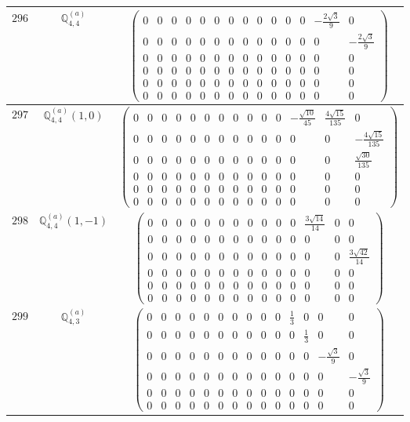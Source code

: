 \documentclass[fleqn,8pt,landscape]{jsarticle}
\begin{document}
\begin{center}
\begin{longtable}{ccc}
$ 296 $ & $ \mathbb{Q}_{4,4}^{(a)} $ & $ \begin{pmatrix} 0 & 0 & 0 & 0 & 0 & 0 & 0 & 0 & 0 & 0 & 0 & 0 & - \frac{2 \sqrt{3}}{9} & 0 \\ 0 & 0 & 0 & 0 & 0 & 0 & 0 & 0 & 0 & 0 & 0 & 0 & 0 & - \frac{2 \sqrt{3}}{9} \\ 0 & 0 & 0 & 0 & 0 & 0 & 0 & 0 & 0 & 0 & 0 & 0 & 0 & 0 \\ 0 & 0 & 0 & 0 & 0 & 0 & 0 & 0 & 0 & 0 & 0 & 0 & 0 & 0 \\ 0 & 0 & 0 & 0 & 0 & 0 & 0 & 0 & 0 & 0 & 0 & 0 & 0 & 0 \\ 0 & 0 & 0 & 0 & 0 & 0 & 0 & 0 & 0 & 0 & 0 & 0 & 0 & 0 \end{pmatrix} $ \\ \hline
$ 297 $ & $ \mathbb{Q}_{4,4}^{(a)}(1,0) $ & $ \begin{pmatrix} 0 & 0 & 0 & 0 & 0 & 0 & 0 & 0 & 0 & 0 & 0 & - \frac{\sqrt{10}}{45} & \frac{4 \sqrt{15}}{135} & 0 \\ 0 & 0 & 0 & 0 & 0 & 0 & 0 & 0 & 0 & 0 & 0 & 0 & 0 & - \frac{4 \sqrt{15}}{135} \\ 0 & 0 & 0 & 0 & 0 & 0 & 0 & 0 & 0 & 0 & 0 & 0 & 0 & \frac{\sqrt{30}}{135} \\ 0 & 0 & 0 & 0 & 0 & 0 & 0 & 0 & 0 & 0 & 0 & 0 & 0 & 0 \\ 0 & 0 & 0 & 0 & 0 & 0 & 0 & 0 & 0 & 0 & 0 & 0 & 0 & 0 \\ 0 & 0 & 0 & 0 & 0 & 0 & 0 & 0 & 0 & 0 & 0 & 0 & 0 & 0 \end{pmatrix} $ \\ \hline
$ 298 $ & $ \mathbb{Q}_{4,4}^{(a)}(1,-1) $ & $ \begin{pmatrix} 0 & 0 & 0 & 0 & 0 & 0 & 0 & 0 & 0 & 0 & 0 & \frac{3 \sqrt{14}}{14} & 0 & 0 \\ 0 & 0 & 0 & 0 & 0 & 0 & 0 & 0 & 0 & 0 & 0 & 0 & 0 & 0 \\ 0 & 0 & 0 & 0 & 0 & 0 & 0 & 0 & 0 & 0 & 0 & 0 & 0 & \frac{3 \sqrt{42}}{14} \\ 0 & 0 & 0 & 0 & 0 & 0 & 0 & 0 & 0 & 0 & 0 & 0 & 0 & 0 \\ 0 & 0 & 0 & 0 & 0 & 0 & 0 & 0 & 0 & 0 & 0 & 0 & 0 & 0 \\ 0 & 0 & 0 & 0 & 0 & 0 & 0 & 0 & 0 & 0 & 0 & 0 & 0 & 0 \end{pmatrix} $ \\ \hline
$ 299 $ & $ \mathbb{Q}_{4,3}^{(a)} $ & $ \begin{pmatrix} 0 & 0 & 0 & 0 & 0 & 0 & 0 & 0 & 0 & 0 & \frac{1}{3} & 0 & 0 & 0 \\ 0 & 0 & 0 & 0 & 0 & 0 & 0 & 0 & 0 & 0 & 0 & \frac{1}{3} & 0 & 0 \\ 0 & 0 & 0 & 0 & 0 & 0 & 0 & 0 & 0 & 0 & 0 & 0 & - \frac{\sqrt{3}}{9} & 0 \\ 0 & 0 & 0 & 0 & 0 & 0 & 0 & 0 & 0 & 0 & 0 & 0 & 0 & - \frac{\sqrt{3}}{9} \\ 0 & 0 & 0 & 0 & 0 & 0 & 0 & 0 & 0 & 0 & 0 & 0 & 0 & 0 \\ 0 & 0 & 0 & 0 & 0 & 0 & 0 & 0 & 0 & 0 & 0 & 0 & 0 & 0 \end{pmatrix} $ \\ \hline

\end{longtable}
\end{center}
\end{document}
